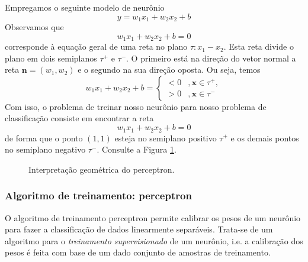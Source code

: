 Empregamos o seguinte modelo de neurônio
\begin{equation}
  y = w_1x_1 + w_2x_2 + b
\end{equation}
Observamos que
\begin{equation}
  w_1x_1 + w_2x_2 + b = 0
\end{equation}
corresponde à equação geral de uma reta no plano $\tau: x_1-x_2$. Esta reta divide o plano em dois semiplanos $\tau^+$ e $\tau^-$. O primeiro está na direção do vetor normal a reta $\pmb{n} = (w_1, w_2)$ e o segundo na sua direção oposta. Ou seja, temos
\begin{equation}
  w_1x_1 + w_2x_2 + b = \left\{
    \begin{array}{ll}
      <0 &, \pmb{x}\in\tau^+,\\
      >0 &, \pmb{x}\in\tau^-
    \end{array}
  \right.
\end{equation}
Com isso, o problema de treinar nosso neurônio para nosso problema de classificação consiste em encontrar a reta
\begin{equation}
  w_1x_1 + w_2x_2 + b = 0
\end{equation}
de forma que o ponto $(1,1)$ esteja no semiplano positivo $\tau^+$ e os demais pontos no semiplano negativo $\tau^-$. Consulte a Figura \ref{fig:}.

\begin{figure}[H]
  \centering
  
  \caption{Interpretação geométrica do perceptron.}
  \label{fig:}
\end{figure}

\subsubsection{Algoritmo de treinamento: perceptron}

O algoritmo de treinamento perceptron permite calibrar os pesos de um neurônio para fazer a classificação de dados linearmente separáveis. Trata-se de um algoritmo para o \emph{treinamento supervisionado} de um neurônio, i.e. a calibração dos pesos é feita com base de um dado conjunto de amostras de treinamento.

